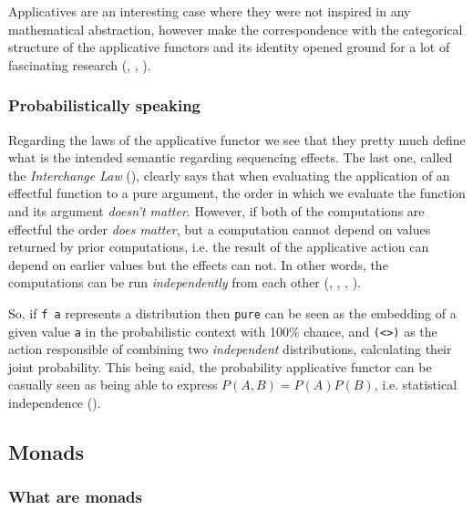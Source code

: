 \documentclass[
  oneside,
  11pt, a4paper,
  footinclude=true,
  headinclude=true,
  cleardoublepage=empty
]{scrbook}
\theoremstyle{definition}
\theoremstyle{definition}
\begin{document}
	            Applicatives are an interesting case where they were not inspired in any mathematical abstraction, however \cite{mcbride2008applicative} make the correspondence with the categorical structure of the applicative functors and its identity opened ground for a lot of fascinating research (\cite{Paterson:2012:CAF:2368298.2368321}, \cite{Cooper:2008:EFA:1485346.1485361}, \cite{DBLP:journals/corr/CapriottiK14}).
	        
	        \subsubsection{Probabilistically speaking}
	            
	            Regarding the laws of the applicative functor we see that they pretty much define what is the intended semantic regarding sequencing effects. The last one, called the \emph{Interchange Law} (\cite{mcbride2008applicative}), clearly says that when evaluating the application of an effectful function to a pure argument, the order in which we evaluate the function and its argument \emph{doesn't matter}. However, if both of the computations are effectful the order \emph{does matter}, but a computation cannot depend on values returned by prior computations, i.e. the result of the applicative action can depend on earlier values but the effects can not. In other words, the computations can be run \emph{independently} from each other (\cite{Cooper:2008:EFA:1485346.1485361}, \cite{Marlow:2014:NFA:2692915.2628144}, \cite{Marlow:2016:DHD:3241625.2976007}, \cite{andrey2019selective}).
	            
	            So, if \texttt{f a} represents a distribution then \texttt{pure} can be seen as the embedding of a given value \texttt{a} in the probabilistic context with 100\% chance, and \texttt{(\textless*\textgreater)} as the action responsible of combining two \emph{independent} distributions, calculating their joint probability. This being said, the probability applicative functor can be casually seen as being able to express $P(A, B) = P(A)P(B)$, i.e. statistical independence (\cite{jtobin}).
	    
	    \subsection{Monads}
	    
	        \subsubsection{What are monads}
	        
\end{document}
